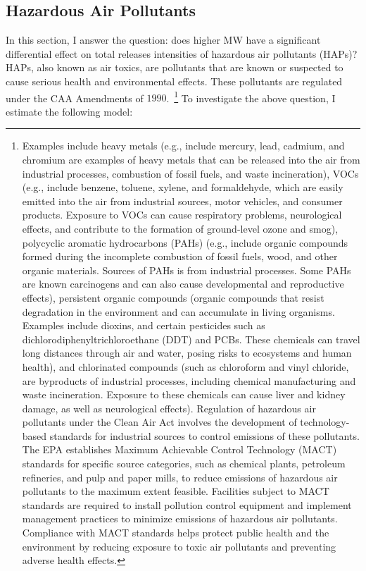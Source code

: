 \documentclass[12pt, english]{article}
\begin{document}
    \subsection{Hazardous Air Pollutants}\label{subsec:hazardous-air-pollutants}
    In this section, I answer the question: does higher MW have a significant differential effect on total releases intensities of hazardous air pollutants (HAPs)? HAPs, also known as air toxics, are pollutants that are known or suspected to cause serious health and environmental effects. These pollutants are regulated under the CAA Amendments of $1990$.~\footnote{\tiny  Examples include heavy metals (e.g., include mercury, lead, cadmium, and chromium are examples of heavy metals that can be released into the air from industrial processes, combustion of fossil fuels, and waste incineration), VOCs (e.g., include benzene, toluene, xylene, and formaldehyde, which are easily emitted into the air from industrial sources, motor vehicles, and consumer products. Exposure to VOCs can cause respiratory problems, neurological effects, and contribute to the formation of ground-level ozone and smog), polycyclic aromatic hydrocarbons (PAHs) (e.g., include organic compounds formed during the incomplete combustion of fossil fuels, wood, and other organic materials. Sources of PAHs is from industrial processes. Some PAHs are known carcinogens and can also cause developmental and reproductive effects), persistent organic compounds (organic compounds that resist degradation in the environment and can accumulate in living organisms. Examples include dioxins, and certain pesticides such as dichlorodiphenyltrichloroethane (DDT) and PCBs. These chemicals can travel long distances through air and water, posing risks to ecosystems and human health), and chlorinated compounds (such as chloroform and vinyl chloride, are byproducts of industrial processes, including chemical manufacturing and waste incineration. Exposure to these chemicals can cause liver and kidney damage, as well as neurological effects). Regulation of hazardous air pollutants under the Clean Air Act involves the development of technology-based standards for industrial sources to control emissions of these pollutants. The EPA establishes Maximum Achievable Control Technology (MACT) standards for specific source categories, such as chemical plants, petroleum refineries, and pulp and paper mills, to reduce emissions of hazardous air pollutants to the maximum extent feasible. Facilities subject to MACT standards are required to install pollution control equipment and implement management practices to minimize emissions of hazardous air pollutants. Compliance with MACT standards helps protect public health and the environment by reducing exposure to toxic air pollutants and preventing adverse health effects.} To investigate the above question, I estimate the following model:
\end{document}
